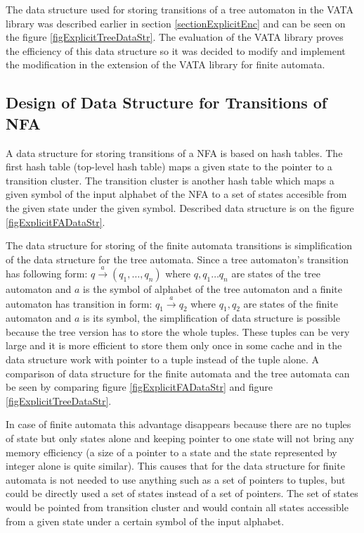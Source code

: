 The data structure used for storing transitions of a tree automaton in the VATA library was described earlier in section \ref{sectionExplicitEnc} and can be seen
on the figure \ref{figExplicitTreeDataStr}. The evaluation of the VATA library \cite{libvata} proves the efficiency of this data structure so it was
decided to modify and implement the modification in the extension of the VATA library for finite automata.

\subsection{Design of Data Structure for Transitions of NFA}
A data structure for storing transitions of a NFA is based on hash tables. The first hash table (top-level hash table) maps a given state to the pointer to
a transition cluster. The transition cluster is another hash table which maps a given symbol of the input alphabet of the NFA to a set of states accesible from
the given state under the given symbol. 
Described data structure is on the figure \ref{figExplicitFADataStr}.

The data structure for storing of the finite automata transitions is simplification of the data structure for the tree automata. Since a tree automaton's
transition has following form: $q \xrightarrow{a} (q_1,\ldots,q_n)$ where $q,q_1\ldots q_n$ are states of the tree automaton and $a$ is the symbol of 
alphabet of the tree automaton and a finite automaton has transition in form: $q_1 \xrightarrow{a} q_2$ where $q_1,q_2$ are states of the finite automaton and
$a$ is its symbol, the simplification of data structure is possible because the tree version has to store the whole tuples. These tuples can be very 
large and it is more efficient to store them only once in some cache and in the data structure work with pointer to a tuple instead of the tuple alone. 
A comparison of data structure for the finite automata and the tree automata can be seen by comparing figure 
\ref{figExplicitFADataStr} and figure \ref{figExplicitTreeDataStr}.

In case of finite automata this advantage disappears because there are no tuples of state but only states alone and keeping pointer to one state will not 
bring any memory efficiency (a size of a pointer to a state and the state represented by integer alone is quite similar). This causes that for the data structure 
for finite automata is not needed to use anything such as a set of pointers to tuples, but could be directly used a set of states instead of
a set of pointers. The set of states would be pointed from transition cluster and would contain all states accessible from a given state under a 
certain symbol of the input alphabet.

